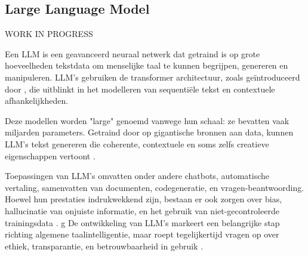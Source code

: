    \subsection{Large Language Model}
    
    
    WORK IN PROGRESS
    
     Een LLM is een geavanceerd neuraal netwerk dat getraind is op grote hoeveelheden tekstdata om menselijke taal te kunnen begrijpen, genereren en manipuleren. LLM's gebruiken de transformer architectuur, zoals geïntroduceerd door \textcite{vaswani2023attentionneed}, die uitblinkt in het modelleren van sequentiële tekst en contextuele afhankelijkheden.
      
     Deze modellen worden "large" genoemd vanwege hun schaal: ze bevatten vaak miljarden parameters. Getraind door op gigantische bronnen aan data, kunnen LLM's tekst genereren die coherente, contextuele en soms zelfs creatieve eigenschappen vertoont \autocite{Gupta2025}.
      
     Toepassingen van LLM's omvatten onder andere chatbots, automatische vertaling, samenvatten van documenten, codegeneratie, en vragen-beantwoording. Hoewel hun prestaties indrukwekkend zijn, bestaan er ook zorgen over bias, hallucinatie van onjuiste informatie, en het gebruik van niet-gecontroleerde trainingsdata \autocite{Gupta2025}.
      g
     De ontwikkeling van LLM’s markeert een belangrijke stap richting algemene taalintelligentie, maar roept tegelijkertijd vragen op over ethiek, transparantie, en betrouwbaarheid in gebruik \autocite{Gupta2025}.
     
     
     
     
